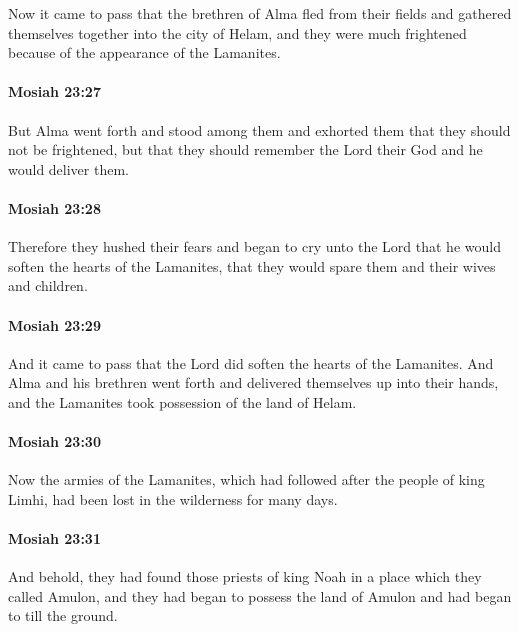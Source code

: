 			Now it came to pass that the brethren of Alma fled from their fields
			and gathered themselves together into the city of Helam,
			and they were much frightened because of the appearance of the Lamanites.

		\paragraph{Mosiah 23:27} %
			\label{MOSIAH-23-27}

			But Alma went forth and stood among them
			and exhorted them that they should not be frightened,
			but that they should remember the Lord their God
			and he would deliver them.

		\paragraph{Mosiah 23:28} %
			\label{MOSIAH-23-28}

			Therefore they hushed their fears
			and began to cry unto the Lord
			that he would soften the hearts of the Lamanites,
			that they would spare them and their wives and children.

		\paragraph{Mosiah 23:29} %
			\label{MOSIAH-23-29}

			And it came to pass that the Lord did soften the hearts of the Lamanites.
			And Alma and his brethren went forth
			and delivered themselves up into their hands,
			and the Lamanites took possession of the land of Helam.

		\paragraph{Mosiah 23:30} %
			\label{MOSIAH-23-30}

			Now the armies of the Lamanites,
			which had followed after the people of king Limhi,
			had been lost in the wilderness for many days.

		\paragraph{Mosiah 23:31} %
			\label{MOSIAH-23-31}

			And behold, they had found those priests of king Noah
			in a place which they called Amulon,
			and they had began to possess the land of Amulon
			and had began to till the ground.

